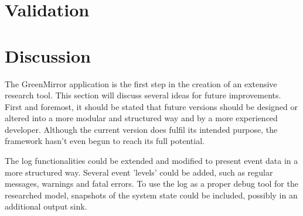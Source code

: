 \documentclass[a4paper]{article}
\begin{document}
	
	
	
	
	
	
	
	
	\section{Validation}\label{sec:validation}
	
	
	
	
	\section{Discussion}\label{sec:discussion}
	The GreenMirror application is the first step in the creation of an extensive research tool. This section will discuss several ideas for future improvements. First and foremost, it should be stated that future versions should be designed or altered into a more modular and structured way and by a more experienced developer. Although the current version does fulfil its intended purpose, the framework hasn't even begun to reach its full potential.
	
	The log functionalities could be extended and modified to present event data in a more structured way. Several event 'levels' could be added, such as regular messages, warnings and fatal errors. To use the log as a proper debug tool for the researched model, snapshots of the system state could be included, possibly in an additional output sink.
	
\end{document}
